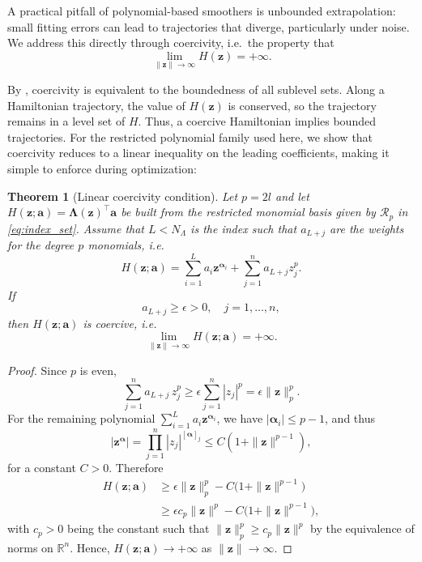 \documentclass[11pt, a4paper]{article}
\theoremstyle{plain}
\newtheorem{theorem}{Theorem}[section]
\theoremstyle{definition}
\theoremstyle{remark}
\begin{document}
A practical pitfall of polynomial-based smoothers is unbounded extrapolation: small fitting errors can lead to trajectories that diverge, particularly under noise. We address this directly through coercivity, i.e.\ the property that
\[
\lim_{\|\mathbf{z}\|\to\infty} H(\mathbf{z})=+\infty.
\]

By \cite[Prop.~11.11]{bauschke2017}, coercivity is equivalent to the boundedness of all sublevel sets. Along a Hamiltonian trajectory, the value of
\(H(\mathbf{z})\) is conserved, so the trajectory remains in a level set of \(H\). Thus, a coercive Hamiltonian implies bounded trajectories. For the restricted polynomial family used here, we show that coercivity reduces to a linear inequality on the leading coefficients, making it simple to enforce during optimization:

\begin{theorem}[Linear coercivity condition]\label{thm:coercivity}
Let \(p=2l\) and let \(H(\mathbf{z};\mathbf{a})=\boldsymbol{\Lambda}(\mathbf{z})^\top \mathbf{a}\) be built from the
restricted monomial basis given by $\mathcal R_p$ in \eqref{eq:index_set}. Assume that $L<N_{\Lambda}$ is the index such that  $a_{L+j}$ are the weights for the degree $p$ monomials, i.e. 
\[
H(\mathbf{z};\mathbf{a})= \sum_{i=1}^L a_i\mathbf{z}^{\boldsymbol{\alpha}_i} + \sum_{j=1}^{n} a_{L+j} z_j^p.
\]
If 
\begin{equation}
a_{L+j}\ge \epsilon >0, \quad j=1,\dots,n,
\label{eq:coercivity_constraint}
\end{equation}
then \(H(\mathbf{z};\mathbf{a})\) is coercive, i.e.
\[
\lim_{\|\mathbf{z}\|\to\infty} H(\mathbf{z};\mathbf{a})=+\infty.
\]
\end{theorem}

\begin{proof}
Since \(p\) is even,
\[
\sum_{j=1}^n a_{L+j}\, z_j^p
\ge
\epsilon \sum_{j=1}^n |z_j|^p
=
\epsilon \|\mathbf{z}\|_{p}^{p} .
\]
For the remaining polynomial
\(\sum_{i=1}^L a_i\mathbf{z}^{\boldsymbol{\alpha}_i}\),
we have $|\boldsymbol{\alpha}_i| \leq p-1$, and thus
\[
|\mathbf{z}^{\boldsymbol{\alpha}}|
=
\prod_{j=1}^n |z_j|^{[\boldsymbol{\alpha}]_j}
\le
C(1+\|\mathbf{z}\|^{p-1}),
\]
for a constant $C>0$. Therefore
\begin{align*}
H(\mathbf{z};\mathbf{a})
&\ge
\epsilon \|\mathbf{z}\|_p^{p} - C\bigl(1+\|\mathbf{z}\|^{p-1}\bigr)\\
&\ge \epsilon c_p \|\mathbf{z}\|^p - C\bigl(1+\|\mathbf{z}\|^{p-1}\bigr),
\end{align*}
with \(c_p>0\) being the constant such that \(\|\mathbf{z}\|_p^p \ge c_p \|\mathbf{z}\|^p\) by the equivalence of norms on \(\mathbb R^n\).
Hence, 
\(H(\mathbf{z};\mathbf{a})\to +\infty\)
as \(\|\mathbf{z}\|\to\infty\).
\end{proof}
\end{document}
